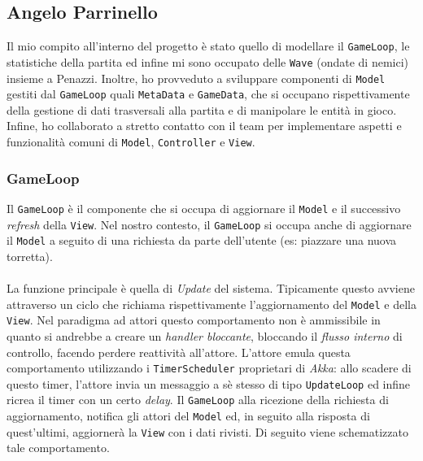 \subsection{Angelo Parrinello}
Il mio compito all’interno del progetto è stato quello di modellare il \texttt{GameLoop}, le statistiche della partita ed infine mi sono occupato delle \texttt{Wave} (ondate di nemici) insieme a Penazzi. Inoltre, ho provveduto a sviluppare componenti di \texttt{Model} gestiti dal \texttt{GameLoop} quali \texttt{MetaData} e \texttt{GameData}, che si occupano rispettivamente della gestione di dati trasversali alla partita e di manipolare le entità in gioco. Infine, ho collaborato a stretto contatto con il team per implementare aspetti e funzionalità comuni di \texttt{Model}, \texttt{Controller} e \texttt{View}.

\subsubsection{GameLoop}
Il \texttt{GameLoop} è il componente che si occupa di aggiornare il \texttt{Model} e il successivo \textit{refresh} della \texttt{View}. Nel nostro contesto, il \texttt{GameLoop} si occupa anche di aggiornare il \texttt{Model} a seguito di una richiesta da parte dell'utente (es: piazzare una nuova torretta).\\
\\La funzione principale è quella di \textit{Update} del sistema. Tipicamente questo avviene attraverso un ciclo che richiama rispettivamente l'aggiornamento del \texttt{Model} e della \texttt{View}. Nel paradigma ad attori questo comportamento non è ammissibile in quanto si andrebbe a creare un \textit{handler bloccante}, bloccando il \textit{flusso interno} di controllo, facendo perdere reattività all'attore. L'attore emula questa comportamento utilizzando i \texttt{TimerScheduler} proprietari di \textit{Akka}: allo scadere di questo timer, l'attore invia un messaggio a sè stesso di tipo \texttt{UpdateLoop} ed infine ricrea il timer con un certo \textit{delay}. Il \texttt{GameLoop} alla ricezione della richiesta di aggiornamento, notifica gli attori del \texttt{Model} ed, in seguito alla risposta di quest'ultimi, aggiornerà la \texttt{View} con i dati rivisti. Di seguito viene schematizzato tale comportamento.

